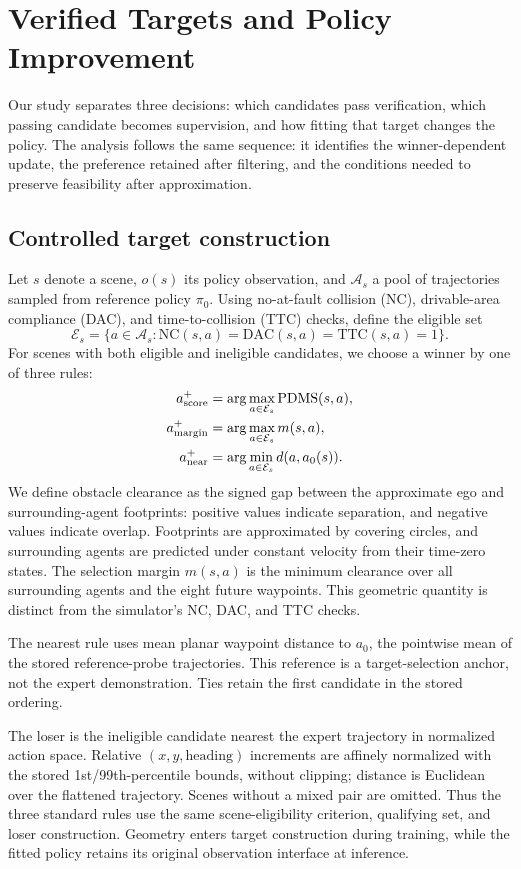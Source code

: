 \documentclass[letterpaper,10pt,conference]{ieeeconf}
\newcommand{\PDMS}{\mathrm{PDMS}}
\newcommand{\NC}{\mathrm{NC}}
\newcommand{\DAC}{\mathrm{DAC}}
\newcommand{\TTC}{\mathrm{TTC}}
\begin{document}
\section{Verified Targets and Policy Improvement}
Our study separates three decisions: which candidates pass verification, which passing candidate becomes supervision, and how fitting that target changes the policy. The analysis follows the same sequence: it identifies the winner-dependent update, the preference retained after filtering, and the conditions needed to preserve feasibility after approximation.
\subsection{Controlled target construction}
Let $s$ denote a scene, $o(s)$ its policy observation, and $\mathcal A_s$ a pool of trajectories sampled from reference policy $\pi_0$. Using no-at-fault collision (NC), drivable-area compliance (DAC), and time-to-collision (TTC) checks, define the eligible set
\begin{equation}
\mathcal E_s=\{a\in\mathcal A_s:\NC(s,a)=\DAC(s,a)=\TTC(s,a)=1\}.
\end{equation}
For scenes with both eligible and ineligible candidates, we choose a winner by one of three rules:
\begin{align}
a^+_{\rm score}&=\arg\max_{a\in\mathcal E_s}\PDMS(s,a),\nonumber\\
a^+_{\rm margin}&=\arg\max_{a\in\mathcal E_s}m(s,a),\label{eq:rules}\\
a^+_{\rm near}&=\arg\min_{a\in\mathcal E_s}d(a,a_0(s)).\nonumber
\end{align}
We define obstacle clearance as the signed gap between the approximate ego and surrounding-agent footprints: positive values indicate separation, and negative values indicate overlap. Footprints are approximated by covering circles, and surrounding agents are predicted under constant velocity from their time-zero states. The selection margin $m(s,a)$ is the minimum clearance over all surrounding agents and the eight future waypoints. This geometric quantity is distinct from the simulator's NC, DAC, and TTC checks.

The nearest rule uses mean planar waypoint distance to $a_0$, the pointwise mean of the stored reference-probe trajectories. This reference is a target-selection anchor, not the expert demonstration. Ties retain the first candidate in the stored ordering.

The loser is the ineligible candidate nearest the expert trajectory in normalized action space. Relative $(x,y,\mathrm{heading})$ increments are affinely normalized with the stored 1st/99th-percentile bounds, without clipping; distance is Euclidean over the flattened trajectory. Scenes without a mixed pair are omitted. Thus the three standard rules use the same scene-eligibility criterion, qualifying set, and loser construction. Geometry enters target construction during training, while the fitted policy retains its original observation interface at inference.
\end{document}
